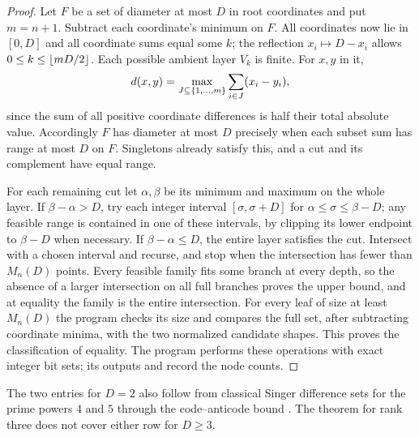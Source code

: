 \begin{proof}
Let $F$ be a set of diameter at most $D$ in root coordinates and put $m=n+1$. Subtract
each coordinate's minimum on $F$. All coordinates now lie in $[0,D]$ and all coordinate
sums equal some $k$; the reflection $x_i\mapsto D-x_i$ allows
$0\le k\le\lfloor mD/2\rfloor$. Each possible ambient layer $V_k$ is finite. For $x,y$ in it,
\[
 d(x,y)=\max_{J\subseteq\{1,\ldots,m\}}\sum_{i\in J}(x_i-y_i),
\]
since the sum of all positive coordinate differences is half their total absolute value.
Accordingly $F$ has diameter at most $D$ precisely when each subset sum has range at most
$D$ on $F$. Singletons already satisfy this, and a cut and its complement have equal
range.

For each remaining cut let $\alpha,\beta$ be its minimum and maximum on the whole layer.
If $\beta-\alpha>D$, try each integer interval $[\sigma,\sigma+D]$ for
$\alpha\le\sigma\le\beta-D$; any feasible range is contained in one of these intervals,
by clipping its lower endpoint to $\beta-D$ when necessary. If $\beta-\alpha\le D$, the
entire layer satisfies the cut. Intersect with a chosen interval and recurse, and stop
when the intersection has fewer than $M_n(D)$ points. Every feasible family fits some
branch at every depth, so the absence of a larger intersection on all full branches
proves the upper bound, and at equality the family is the entire intersection. For every
leaf of size at least $M_n(D)$ the program checks its size and compares the full set,
after subtracting coordinate minima, with the two normalized candidate shapes. This
proves the classification of equality. \gppsloppy The program
 performs these
operations with exact integer bit sets; its outputs
 and
 record the node counts.
\end{proof}

The two entries for $D=2$ also follow from classical Singer difference sets for the
prime powers $4$ and $5$ through the code--anticode bound
\cite{Kovacevic2017Improved,Kovacevic2026Isodiametric}. The theorem for rank three does
not cover either row for $D\ge3$.


